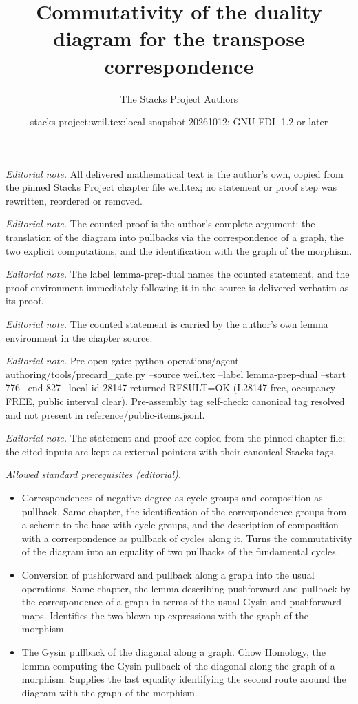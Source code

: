 \documentclass[10pt,a4paper]{amsart}
\title{Commutativity of the duality diagram for the transpose correspondence}
\author{The Stacks Project Authors}
\date{stacks-project:weil.tex:local-snapshot-20261012; GNU FDL 1.2 or later}
\theoremstyle{plain}
\theoremstyle{definition}
\theoremstyle{remark}
\numberwithin{equation}{subsection}
\begin{document}
\maketitle
\noindent\textit{Editorial note.} All delivered mathematical text is the author's own, copied from the pinned Stacks Project chapter file weil.tex; no statement or proof step was rewritten, reordered or removed.\par\medskip
\noindent\textit{Editorial note.} The counted proof is the author's complete argument: the translation of the diagram into pullbacks via the correspondence of a graph, the two explicit computations, and the identification with the graph of the morphism.\par\medskip
\noindent\textit{Editorial note.} The label lemma-prep-dual names the counted statement, and the proof environment immediately following it in the source is delivered verbatim as its proof.\par\medskip
\noindent\textit{Editorial note.} The counted statement is carried by the author's own lemma environment in the chapter source.\par\medskip
\noindent\textit{Editorial note.} Pre-open gate: python operations/agent-authoring/tools/precard\_gate.py --source weil.tex --label lemma-prep-dual --start 776 --end 827 --local-id 28147 returned RESULT=OK (L28147 free, occupancy FREE, public interval clear). Pre-assembly tag self-check: canonical tag resolved and not present in reference/public-items.jsonl.\par\medskip
\noindent\textit{Editorial note.} The statement and proof are copied from the pinned chapter file; the cited inputs are kept as external pointers with their canonical Stacks tags.\par\medskip
\noindent\textit{Allowed standard prerequisites (editorial).}\begin{itemize}
\item Correspondences of negative degree as cycle groups and composition as pullback. Same chapter, the identification of the correspondence groups from a scheme to the base with cycle groups, and the description of composition with a correspondence as pullback of cycles along it. Turns the commutativity of the diagram into an equality of two pullbacks of the fundamental cycles.
\item Conversion of pushforward and pullback along a graph into the usual operations. Same chapter, the lemma describing pushforward and pullback by the correspondence of a graph in terms of the usual Gysin and pushforward maps. Identifies the two blown up expressions with the graph of the morphism.
\item The Gysin pullback of the diagonal along a graph. Chow Homology, the lemma computing the Gysin pullback of the diagonal along the graph of a morphism. Supplies the last equality identifying the second route around the diagram with the graph of the morphism.
\end{itemize}\medskip
\end{document}
